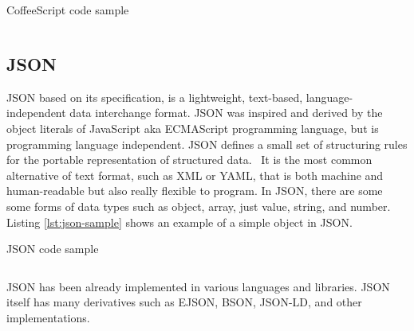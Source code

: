 \begin{listing}[ht]
\caption{CoffeeScript code sample}
\inputminted{javascript}{\dir/include/coffee-sample.coffee}
\label{lst:coffee-sample}
\end{listing}

\subsection{JSON}

\ac{JSON} based on its specification, is a lightweight, text-based, language-independent data interchange format.
\ac{JSON} was inspired and derived by the object literals of JavaScript aka ECMAScript programming language, but is programming language independent.
\ac{JSON} defines a small set of structuring rules for the portable representation of structured data.~\autocite{ECMA:2013:JSON}
It is the most common alternative of text format, such as \ac{XML} or \ac{YAML}, that is both machine and human-readable but also really flexible to program.
In \ac{JSON}, there are some some forms of data types such as object, array, just value, string, and number.
Listing \autoref{lst:json-sample} shows an example of a simple object in \ac{JSON}.

\begin{listing}[ht]
\caption{JSON code sample}
\inputminted{javascript}{\dir/include/json-sample.json}
\label{lst:json-sample}
\end{listing}

JSON has been already implemented in various languages and libraries.
JSON itself has many derivatives such as \ac{EJSON}, \ac{BSON}, \ac{JSON-LD}, and other implementations.
